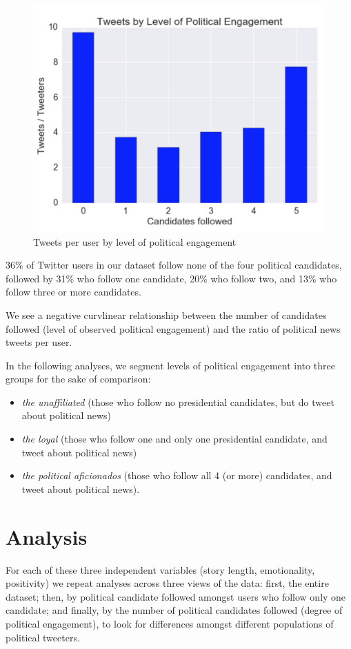 \documentclass[letterpaper]{article}
\begin{document}
\begin{figure}[t!]  
\centering 
  \includegraphics[width=1.0\columnwidth]{tweet-ratio-vs-engagement}  
  \caption{Tweets per user by level of political engagement
    \label{fig:tweet-ratio-engagement}}
\end{figure}

36\% of Twitter users in our dataset follow none of the four political candidates, followed by 31\% who follow one candidate, 20\% who follow two, and 13\% who follow three or more candidates. 



We see a negative curvlinear relationship between the number of candidates followed (level of observed political engagement) and the ratio of political news tweets per user.


In the following analyses, we segment levels of political engagement into three groups for the sake of comparison:

\begin{itemize}
  \item \emph{the unaffiliated} (those who follow no presidential candidates, but do tweet about political news)
  \item \emph{the loyal} (those who follow one and only one presidential candidate, and tweet about political news)
  \item \emph{the political aficionados} (those who follow all 4 (or more) candidates, and tweet about political news).
\end{itemize}


\section{Analysis} 
For each of these three independent variables (story length, emotionality, positivity) we repeat analyses across three views of the data: first, the entire dataset; then, by political candidate followed amongst users who follow only one candidate; and finally, by the number of political candidates followed (degree of political engagement), to look for differences amongst different populations of political tweeters.
\end{document}
